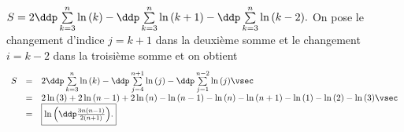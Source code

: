 \begin{correction}
\begin{enumerate}
$S=2\ddp \sum\limits_{k=3}^{n} \ln{(k)}-\ddp \sum\limits_{k=3}^{n} \ln{(k+1)}-\ddp \sum\limits_{k=3}^{n} \ln{(k-2)}.$ On pose le changement d'indice $j=k+1$ dans la deuxi\`{e}me somme et le changement $i=k-2$ dans la troisi\`{e}me somme et on obtient 
$$\begin{array}{lll}
S&=&2\ddp \sum\limits_{k=3}^{n} \ln{(k)}-\ddp \sum\limits_{j=4}^{n+1} \ln{(j)}-\ddp \sum\limits_{j=1}^{n-2} \ln{(j)}\vsec\\
&=& 2\ln{(3)}+2\ln{(n-1)}+2\ln{(n)}-\ln{(n-1)}-\ln{(n)}-\ln{(n+1)}-\ln{(1)}-\ln{(2)}-\ln{(3)}\vsec\\
&=& \fbox{$\ln{\left( \ddp\frac{ 3n(n-1) }{ 2(n+1) }  \right)}$.}\end{array}$$
\end{enumerate}
\end{correction}